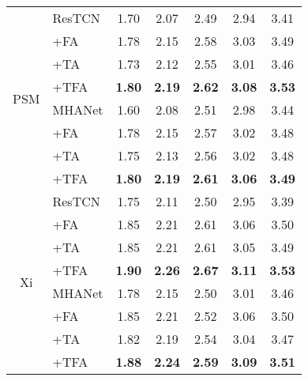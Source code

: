 \begin{table}[!ht]
\begin{tabular}{@{}cl||ccccc@{}}
        \multirow{8}{*}{PSM}
        & ResTCN & 1.70 & 2.07 & 2.49 & 2.94 & 3.41 \\
        & +FA    & 1.78 & 2.15 & 2.58 & 3.03 & 3.49 \\
        & +TA    & 1.73 & 2.12 & 2.55 & 3.01 & 3.46 \\
        & +TFA   & \textbf{1.80} & \textbf{2.19} & \textbf{2.62} & \textbf{3.08} & \textbf{3.53} \\
        \cline{2-7}
        & MHANet & 1.60 & 2.08 & 2.51 & 2.98 & 3.44 \\
        & +FA    & 1.78 & 2.15 & 2.57 & 3.02 & 3.48 \\
        & +TA    & 1.75 & 2.13 & 2.56 & 3.02 & 3.48 \\
        & +TFA   & \textbf{1.80} & \textbf{2.19} & \textbf{2.61} & \textbf{3.06} & \textbf{3.49} \\
        \hline
        \hline
        
        \multirow{8}{*}{Xi}
        & ResTCN & 1.75 & 2.11 & 2.50 & 2.95 & 3.39 \\
        & +FA    & 1.85 & 2.21 & 2.61 & 3.06 & 3.50 \\
        & +TA    & 1.85 & 2.21 & 2.61 & 3.05 & 3.49 \\
        & +TFA   & \textbf{1.90} & \textbf{2.26} & \textbf{2.67} & \textbf{3.11} & \textbf{3.53} \\
        \cline{2-7}
        & MHANet & 1.78 & 2.15 & 2.50 & 3.01 & 3.46 \\
        & +FA    & 1.85 & 2.21 & 2.52 & 3.06 & 3.50 \\
        & +TA    & 1.82 & 2.19 & 2.54 & 3.04 & 3.47 \\
        & +TFA   & \textbf{1.88} & \textbf{2.24} & \textbf{2.59} & \textbf{3.09} & \textbf{3.51}\\
        \hline
    \end{tabular}
    \vspace{-2.0em}
\end{table}